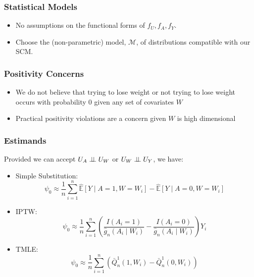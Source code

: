 \documentclass{beamer}
\newcommand{\E}{\mathbb{E}}
\newcommand{\indp}{\ensuremath{\perp\hspace{-5pt}\perp}}
\newcommand{\M}{\mathcal{M}}
\DeclareMathOperator{\logit}{logit}
\begin{document}
\begin{frame}
\begin{minipage}{0.45\linewidth}
\end{minipage}
\end{frame}

\begin{frame}
 \frametitle{Statistical Models}
 \begin{itemize}
  \item No assumptions on the functional forms of $f_U, f_A, f_Y$.
  \item Choose the (non-parametric) model, $\M$, of distributions compatible with our SCM.
 \end{itemize}
\end{frame}

\begin{frame}
\frametitle{Positivity Concerns}
\begin{itemize}
 \item We do not believe that trying to lose weight or not trying to lose weight occurs with probability $0$ given any set of  covariates $W$
 \item Practical positivity violations are a concern given $W$ is high dimensional
\end{itemize}
\end{frame}

\begin{frame}
\frametitle{Estimands}
Provided we can accept $U_A \indp U_W$ or $U_W \indp U_Y$, we have:
\begin{itemize}
  \item Simple Substitution:
    \[
      \psi_0 \approx \frac{1}{n}\sum_{i=1}^{n}\widehat{\E}\left[Y \mid A=1, W=W_i \right] - \widehat{\E}\left[Y \mid A=0, W=W_i\right]
    \]
  \item IPTW:
  \[
    \psi_{0} \approx \frac{1}{n}\sum_{i=1}^{n} \left(\frac{I(A_i=1)}{\hat{g}_n(A_i \mid W_i)} - \frac{I(A_i=0)}{\hat{g}_n(A_i \mid W_i)} \right)Y_i
  \]
  \item TMLE:
  \[
    \psi_{0} \approx \frac{1}{n}\sum_{i=1}^{n}\left( \bar{Q}_{n}^{1}(1,W_i) - \bar{Q}_{n}^{1}(0,W_i)\right)
  \]
\end{itemize}
\end{frame}
\end{document}
